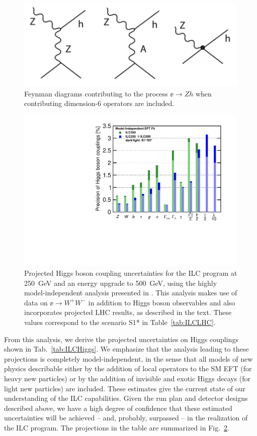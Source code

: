 \begin{figure}
\begin{center}
\includegraphics[width=0.80\hsize]{chapters/figures/Zhdiagrams.pdf}
\end{center}
\caption{Feynman diagrams contributing to the process $\ee\to Zh$ when 
contributing  dimension-6 operators are included. }
\label{fig:eeZhdiagrams}
\end{figure}

\begin{figure}
\begin{center}
\includegraphics[width=0.7\hsize]{chapters/figures/ModelindepSummary.pdf}
\caption{Projected Higgs boson coupling uncertainties for the ILC
  program at 250~GeV and an energy upgrade to 500~GeV, using the
  highly model-independent analysis presented in \cite{Fujii:2017vwa}. This
  analysis makes use of  data on $\ee\to W^+W^-$ in addition to Higgs
  boson observables and also incorporates projected LHC results, as described
  in the text.  These
values correspond to the  scenario S1* in Table~\ref{tab:ILCLHC}.}
\label{fig:ILCmodelindep}
\end{center}
\end{figure}
%
From this analysis, we derive the projected uncertainties on Higgs
couplings shown in Tab.~\ref{tab:ILCHiggs}.  We emphasize that the
analysis leading to these projections is completely model-independent,
in the sense that all models of new physics describable either by the
addition  of local operators to the SM EFT (for heavy new particles)
or by the addition of invisible and exotic Higgs decays (for light new
particles) are included.  These estimates give the
current state of our understanding of the ILC capabilities.  Given the
run plan and  detector designs described above, we have a high degree
of confidence that these estimated uncertainties will be achieved --
and, probably, surpassed -- in the realization of the ILC program.
The projections in the table are summarized in Fig.~\ref{fig:ILCmodelindep}.

